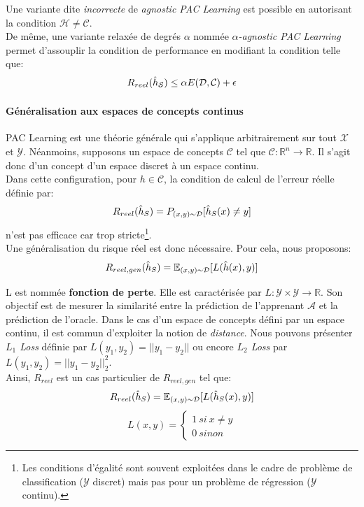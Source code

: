 \noindent Une variante dite \textit{incorrecte} de \textit{agnostic PAC Learning} est possible en autorisant la condition $\mathcal{H} \neq \mathcal{C}$.\\

\noindent De même, une variante relaxée de degrés $\alpha$ nommée \textit{$\alpha$-agnostic PAC Learning} permet d'assouplir la condition de performance en modifiant la condition telle que:
$$R_{reel}(\Hat{h}_\mathcal{S}) \leq \alpha E(\mathcal{D},\mathcal{C}) + \epsilon$$

\paragraph{Généralisation aux espaces de concepts continus}

\noindent PAC Learning est une théorie générale qui s'applique arbitrairement sur tout $\mathcal{X}$ et $\mathcal{Y}$. Néanmoins, supposons un espace de concepts $\mathcal{C}$ tel que $\mathcal{C}:\mathbb{R}^n \rightarrow \mathbb{R}$. Il s'agit donc d'un concept d'un espace discret à un espace continu.\\

\noindent Dans cette configuration, pour $h \in \mathcal{C}$, la condition de calcul de l'erreur réelle définie par:
$$R_{reel}(\Hat{h}_S)=P_{(x,y)\sim\mathcal{D}}[\Hat{h}_S(x)\neq y]$$
\noindent n'est pas efficace car trop stricte\footnote{Les conditions d'égalité sont souvent exploitées dans le cadre de problème de classification ($\mathcal{Y}$ discret) mais pas pour un problème de régression ($\mathcal{Y}$ continu).}.\\

\noindent Une généralisation du risque réel est donc nécessaire. Pour cela, nous proposons:
$$R_{reel,gen}(\Hat{h}_S)=\mathbb{E}_{(x,y)\sim\mathcal{D}}[L(\Hat{h}(x),y)]$$

\noindent L est nommée \textbf{fonction de perte}. Elle est caractérisée par $L\colon\mathcal{Y}\times\mathcal{Y}\rightarrow\mathbb{R}$. Son objectif est de mesurer la similarité entre la prédiction de l'apprenant $\mathcal{A}$ et la prédiction de l'oracle. Dans le cas d'un espace de concepts défini par un espace continu, il est commun d'exploiter la notion de \textit{distance}. Nous pouvons présenter \textit{$L_1$ Loss} définie par $L(y_{1},y_{2})=||y_{1}-y_{2}||$ ou encore \textit{$L_2$ Loss} par $L(y_{1},y_{2})=||y_{1}-y_{2}||_2^{2}$.\\

\noindent Ainsi, $R_{reel}$ est un cas particulier de $R_{reel,gen}$ tel que:
$$R_{reel}(\Hat{h}_S)=\mathbb{E}_{(x,y)\sim\mathcal{D}}[L(\Hat{h}_S(x),y)]$$
$$L(x,y)=\left\{
\begin{array}{l}
  1 \ si \ x \neq y\\
  0 \ sinon
\end{array}
\right.$$

